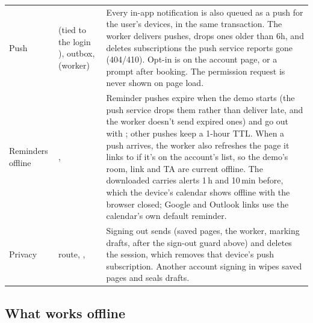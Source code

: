 {\begin{xltabular}{\linewidth}{@{}P{30mm} P{30mm} L@{}}
  Push &  (tied to the login ),  outbox,  (worker) & Every in-app notification is also queued as a push for the user's devices, in the same transaction. The worker delivers pushes, drops ones older than 6h, and deletes subscriptions the push service reports gone (404/410). Opt-in is on the account page, or a prompt after booking. The permission request is never shown on page load.\\
  Reminders offline & ,  & Reminder pushes expire when the demo starts (the push service drops them rather than deliver late, and the worker doesn't send expired ones) and go out with ; other pushes keep a 1-hour TTL. When a push arrives, the worker also refreshes the page it links to if it's on the account's list, so the demo's room, link and TA are current offline. The downloaded  carries alerts 1\,h and 10\,min before, which the device's calendar shows offline with the browser closed; Google and Outlook links use the calendar's own default reminder.\\
  Privacy &  route, ,  & Signing out sends  (saved pages, the worker, marking drafts, after the sign-out guard above) and deletes the session, which removes that device's push subscription. Another account signing in wipes saved pages and seals drafts.\\
  \bottomrule
\end{xltabular}}

\subsection*{What works offline}

